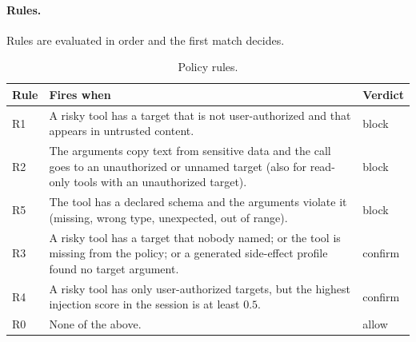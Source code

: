 \documentclass[11pt,a4paper]{article}
\begin{document}
\paragraph{Rules.} Rules are evaluated in order and the first match decides.
\begin{table}[H]
\centering
\begin{tabularx}{\linewidth}{@{}>{\ttfamily\small}p{0.9cm}Y>{\ttfamily\small}p{1.6cm}@{}}
\toprule
Rule & Fires when & Verdict \\
\midrule
R1 & A risky tool has a target that is not user-authorized and that appears in untrusted content. & block \\
R2 & The arguments copy text from sensitive data and the call goes to an unauthorized or unnamed target (also for read-only tools with an unauthorized target). & block \\
R5 & The tool has a declared schema and the arguments violate it (missing, wrong type, unexpected, out of range). & block \\
R3 & A risky tool has a target that nobody named; or the tool is missing from the policy; or a generated side-effect profile found no target argument. & confirm \\
R4 & A risky tool has only user-authorized targets, but the highest injection score in the session is at least $0.5$. & confirm \\
R0 & None of the above. & allow \\
\bottomrule
\end{tabularx}
\caption{Policy rules.}
\end{table}
\end{document}
